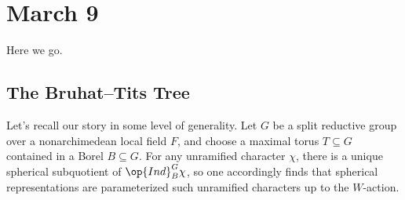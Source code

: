 \documentclass[../notes.tex]{subfiles}
\begin{document}
\section{March 9}
Here we go.

\subsection{The Bruhat--Tits Tree}
Let's recall our story in some level of generality. Let $G$ be a split reductive group over a nonarchimedean local field $F$, and choose a maximal torus $T\subseteq G$ contained in a Borel $B\subseteq G$. For any unramified character $\chi$, there is a unique spherical subquotient of $\op{Ind}_B^G\chi$, so one accordingly finds that spherical representations are parameterized such unramified characters up to the $W$-action.
\end{document}
